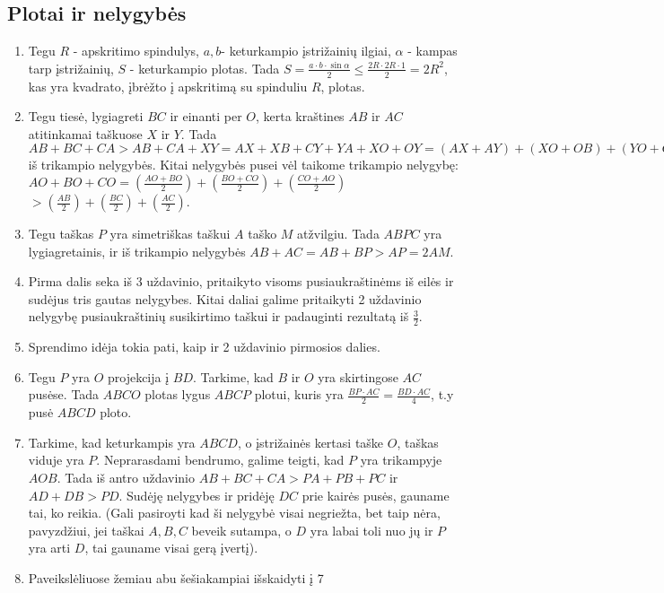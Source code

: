 \subsection*{Plotai ir nelygybės}
\begin{enumerate}
\item
  Tegu $R$ - apskritimo spindulys, $a,b$- keturkampio
  įstrižainių ilgiai, $\alpha$ - kampas tarp įstrižainių,
  $S$ - keturkampio plotas. Tada $S = \frac{a\cdot
  b\cdot\sin \alpha}{2} \leq \frac{2R \cdot 2R \cdot 1}{2}
  = 2R^2$, kas yra kvadrato, įbrėžto į apskritimą su
  spinduliu $R$, plotas.
\item
  Tegu tiesė, lygiagreti $BC$ ir einanti per $O$, kerta
  kraštines $AB$ ir $AC$ atitinkamai taškuose $X$ ir $Y$.
  Tada $AB + BC + CA > AB + CA + XY = AX + XB + CY + YA +
  XO + OY = (AX+AY) + (XO+OB) + (YO+OC) > AO + OB + OC$ iš
  trikampio nelygybės. Kitai nelygybės pusei vėl taikome
  trikampio nelygybę: $AO + BO + CO = (\frac{AO+BO}{2}) +
  (\frac{BO+CO}{2}) + (\frac{CO+AO}{2})$$ > (\frac{AB}{2})
  + (\frac{BC}{2}) + (\frac{AC}{2})$. 
\item
  Tegu taškas $P$ yra simetriškas taškui $A$ taško $M$
  atžvilgiu. Tada $ABPC$ yra lygiagretainis, ir iš
  trikampio nelygybės $AB + AC = AB + BP > AP = 2AM$.
\item
  Pirma dalis seka iš 3 uždavinio, pritaikyto visoms
  pusiaukraštinėms iš eilės ir sudėjus tris gautas
  nelygybes. Kitai daliai galime pritaikyti 2 uždavinio
  nelygybę pusiaukraštinių susikirtimo taškui ir padauginti
  rezultatą iš $\frac{3}{2}$.
\item
  Sprendimo idėja tokia pati, kaip ir 2 uždavinio pirmosios
  dalies.
\item
  Tegu $P$ yra $O$ projekcija į $BD$. Tarkime, kad $B$ ir
  $O$ yra skirtingose $AC$ pusėse. Tada $ABCO$ plotas lygus
  $ABCP$ plotui, kuris yra $\frac{BP\cdot AC}{2} = \frac{BD
  \cdot AC}{4}$, t.y pusė $ABCD$ ploto. 
\item
  Tarkime, kad keturkampis yra $ABCD$, o įstrižainės
  kertasi taške $O$, taškas viduje yra $P$. Neprarasdami
  bendrumo, galime teigti, kad $P$ yra trikampyje $AOB$.
  Tada iš antro uždavinio $AB + BC + CA > PA + PB + PC$ ir
  $AD + DB > PD$. Sudėję nelygybes ir pridėję $DC$ prie
  kairės pusės, gauname tai, ko reikia. (Gali pasiroyti kad
  ši nelygybė visai negriežta, bet taip nėra, pavyzdžiui,
  jei taškai $A, B, C$ beveik sutampa, o $D$ yra labai toli
  nuo jų ir $P$ yra arti $D$, tai gauname visai gerą
  įvertį).
\item
  Paveikslėliuose žemiau abu šešiakampiai išskaidyti į 7
$$
\end{enumerate}
